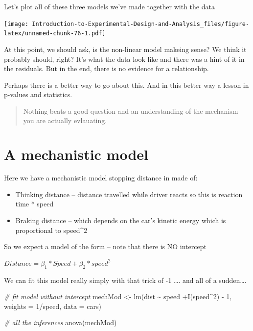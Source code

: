 \documentclass[
]{book}
\newenvironment{Shaded}{\begin{snugshade}}{\end{snugshade}}
\newcommand{\AttributeTok}[1]{\textcolor[rgb]{0.77,0.63,0.00}{#1}}
\newcommand{\CommentTok}[1]{\textcolor[rgb]{0.56,0.35,0.01}{\textit{#1}}}
\newcommand{\DecValTok}[1]{\textcolor[rgb]{0.00,0.00,0.81}{#1}}
\newcommand{\FunctionTok}[1]{\textcolor[rgb]{0.00,0.00,0.00}{#1}}
\newcommand{\NormalTok}[1]{#1}
\newcommand{\OtherTok}[1]{\textcolor[rgb]{0.56,0.35,0.01}{#1}}
\newcommand{\SpecialCharTok}[1]{\textcolor[rgb]{0.00,0.00,0.00}{#1}}
\providecommand{\tightlist}{%
  \setlength{\itemsep}{0pt}\setlength{\parskip}{0pt}}
\begin{document}
Let's plot all of these three models we've made together with the data

\texttt{[image: Introduction-to-Experimental-Design-and-Analysis\_files/figure-latex/unnamed-chunk-76-1.pdf]}

At this point, we should ask, is the non-linear model makeing sense? We think it probably should, right? It's what the data look like and there was a hint of it in the residuals. But in the end, there is no evidence for a relationship.

Perhaps there is a better way to go about this. And in this better way a lesson in p-values and statistics.

\begin{quote}
Nothing beats a good question and an understanding of the mechanism you are actually evlauating.
\end{quote}

\hypertarget{a-mechanistic-model}{%
\section{A mechanistic model}\label{a-mechanistic-model}}

Here we have a mechanistic model stopping distance in made of:

\begin{itemize}
\tightlist
\item
  Thinking distance -- distance travelled while driver reacts so this is reaction time * speed
\item
  Braking distance -- which depends on the car's kinetic energy which is proportional to speed\^{}2
\end{itemize}

So we expect a model of the form -- note that there is NO intercept

\(Distance = \beta_{1}*Speed + \beta_{2}*speed^{2}\)

We can fit this model really simply with that trick of -1 \ldots. and all of a sudden\ldots.

\begin{Shaded}
\begin{Highlighting}[]
\CommentTok{\# fit model without intercept}
\NormalTok{mechMod }\OtherTok{\textless{}{-}} \FunctionTok{lm}\NormalTok{(dist }\SpecialCharTok{\textasciitilde{}}\NormalTok{ speed }\SpecialCharTok{+}\FunctionTok{I}\NormalTok{(speed}\SpecialCharTok{\^{}}\DecValTok{2}\NormalTok{) }\SpecialCharTok{{-}} \DecValTok{1}\NormalTok{, }\AttributeTok{weights =} \DecValTok{1}\SpecialCharTok{/}\NormalTok{speed, }\AttributeTok{data =}\NormalTok{ cars)}

\CommentTok{\# all the inferences}
\FunctionTok{anova}\NormalTok{(mechMod)}
\end{Highlighting}
\end{Shaded}
\end{document}
